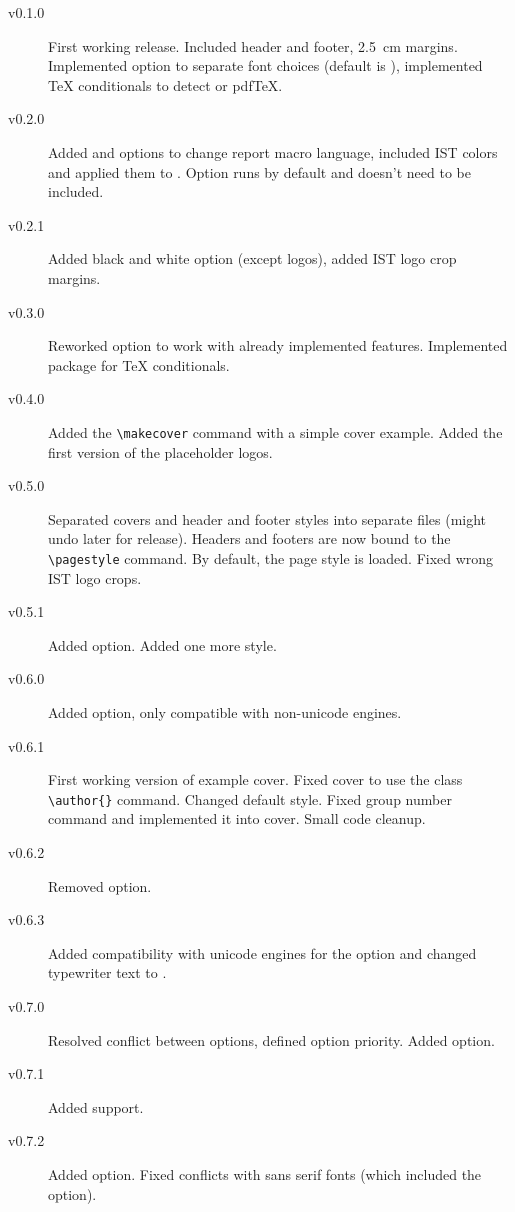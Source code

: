 \documentclass[palatino,english]{ist-report}
\begin{document}
\begin{description}
	\item [v0.1.0] First working release. Included header and footer, \SI{2.5}{\centi\meter} margins. Implemented  option to separate font choices (default is ), implemented \TeX{} conditionals to detect \XeTeX{} or pdf\TeX{}.
	\item [v0.2.0] Added  and  options to change report macro language, included IST colors and applied them to . Option  runs by default and doesn't need to be included.
	\item [v0.2.1] Added black and white option (except logos), added IST logo crop margins.
	\item [v0.3.0] Reworked  option to work with already implemented features. Implemented  package for \TeX{} conditionals.
	\item [v0.4.0] Added the \verb|\makecover| command with a simple cover example. Added the first version of the placeholder logos.
	\item [v0.5.0] Separated covers and header and footer styles into separate files (might undo later for release). Headers and footers are now bound to the \verb|\pagestyle| command. By default, the  page style is loaded. Fixed wrong IST logo crops.
	\item [v0.5.1] Added  option. Added one more style.
	\item [v0.6.0] Added  option, only compatible with non-unicode engines.
	\item [v0.6.1] First working version of example cover. Fixed cover to use the  class \verb|\author{}| command. Changed default style. Fixed group number command and implemented it into cover. Small code cleanup.
	\item [v0.6.2] Removed  option.
	\item [v0.6.3] Added compatibility with unicode engines for the  option and changed typewriter text to .
	\item [v0.7.0] Resolved conflict between options, defined option priority. Added  option.
	\item [v0.7.1] Added \LuaLaTeX{} support.
	\item [v0.7.2] Added  option. Fixed conflicts with sans serif fonts (which included the  option).
\end{description}

\printbibliography
\end{document}
